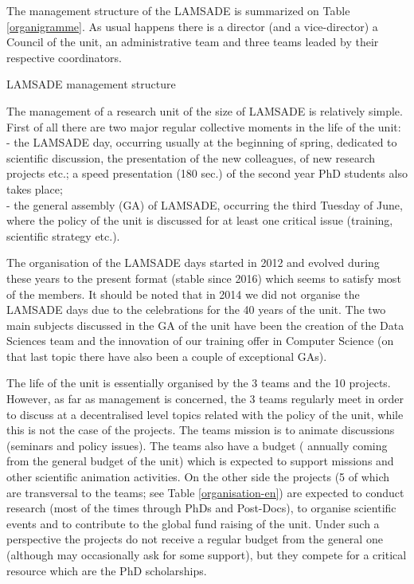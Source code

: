 The management structure of the LAMSADE is summarized on Table \ref{organigramme}. As usual happens there is a director (and a vice-director) a Council of the unit, an administrative team and three teams leaded by their respective coordinators.

\begin{table}
  \centering
  \caption{LAMSADE management structure}\label{organigramme}
\end{table}

The management of a research unit of the size of LAMSADE is relatively simple. First of all there are two major regular collective moments in the life of the unit: \\
 - the LAMSADE day, occurring usually at the beginning of spring, dedicated to scientific discussion, the presentation of the new colleagues, of new research projects etc.; a speed presentation (180 sec.) of the second year PhD students also takes place; \\
 - the general assembly (GA) of LAMSADE, occurring the third Tuesday of June, where the policy of the unit is discussed for at least one critical issue (training, scientific strategy etc.).

The organisation of the LAMSADE days started in 2012 and evolved during these years to the present format (stable since 2016) which seems to satisfy most of the members. It should be noted that in 2014 we did not organise the LAMSADE days due to the celebrations for the 40 years of the unit. The two main subjects discussed in the GA of the unit have been the creation of the Data Sciences team and the innovation of our training offer in Computer Science (on that last topic there have also been a couple of exceptional GAs).

The life of the unit is essentially organised by the 3 teams and the 10 projects. However, as far as management is concerned, the 3 teams regularly meet in order to discuss at a decentralised level topics related with the policy of the unit, while this is not the case of the projects. The teams mission is to animate discussions (seminars and policy issues). The teams also have a budget ( annually coming from the general budget of the unit) which is expected to support missions and other scientific animation activities. On the other side the projects (5 of which are transversal to the teams; see Table \ref{organisation-en}) are expected to conduct research (most of the times through PhDs and Post-Docs), to organise scientific events and to contribute to the global fund raising of the unit. Under such a perspective the projects do not receive a regular budget from the general one (although may occasionally ask for some support), but they compete for a critical resource which are the PhD scholarships.

